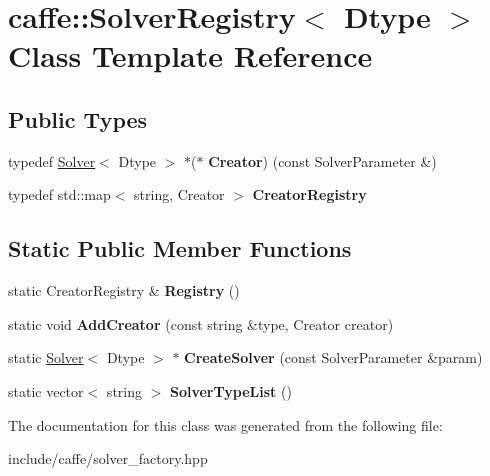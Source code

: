 \hypertarget{classcaffe_1_1SolverRegistry}{}\section{caffe\+:\+:Solver\+Registry$<$ Dtype $>$ Class Template Reference}
\label{classcaffe_1_1SolverRegistry}
\subsection*{Public Types}
\begin{DoxyCompactItemize}
\item 
typedef \hyperlink{classcaffe_1_1Solver}{Solver}$<$ Dtype $>$ $\ast$($\ast$ {\bfseries Creator}) (const Solver\+Parameter \&)\hypertarget{classcaffe_1_1SolverRegistry_a27f13add21a1278d9a41b97b1c03ce1b}{}\label{classcaffe_1_1SolverRegistry_a27f13add21a1278d9a41b97b1c03ce1b}

\item 
typedef std\+::map$<$ string, Creator $>$ {\bfseries Creator\+Registry}\hypertarget{classcaffe_1_1SolverRegistry_acbb92bec38689921e8c76feb85114733}{}\label{classcaffe_1_1SolverRegistry_acbb92bec38689921e8c76feb85114733}

\end{DoxyCompactItemize}
\subsection*{Static Public Member Functions}
\begin{DoxyCompactItemize}
\item 
static Creator\+Registry \& {\bfseries Registry} ()\hypertarget{classcaffe_1_1SolverRegistry_a0dedbd11887e772fcf71a619e054e756}{}\label{classcaffe_1_1SolverRegistry_a0dedbd11887e772fcf71a619e054e756}

\item 
static void {\bfseries Add\+Creator} (const string \&type, Creator creator)\hypertarget{classcaffe_1_1SolverRegistry_a0426cb96095767aa03edd8adb8d97d03}{}\label{classcaffe_1_1SolverRegistry_a0426cb96095767aa03edd8adb8d97d03}

\item 
static \hyperlink{classcaffe_1_1Solver}{Solver}$<$ Dtype $>$ $\ast$ {\bfseries Create\+Solver} (const Solver\+Parameter \&param)\hypertarget{classcaffe_1_1SolverRegistry_aa44d7f6b9efbd266c939665040e84621}{}\label{classcaffe_1_1SolverRegistry_aa44d7f6b9efbd266c939665040e84621}

\item 
static vector$<$ string $>$ {\bfseries Solver\+Type\+List} ()\hypertarget{classcaffe_1_1SolverRegistry_acfb421d7893f5322a42c04b3dd4b559e}{}\label{classcaffe_1_1SolverRegistry_acfb421d7893f5322a42c04b3dd4b559e}

\end{DoxyCompactItemize}


The documentation for this class was generated from the following file\+:\begin{DoxyCompactItemize}
\item 
include/caffe/solver\+\_\+factory.\+hpp\end{DoxyCompactItemize}
